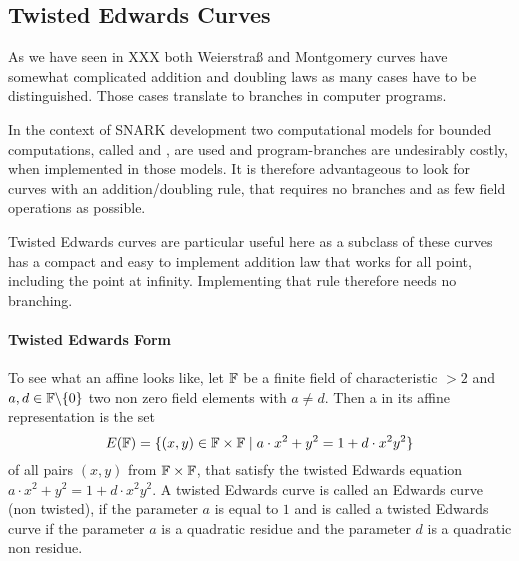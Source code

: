 
\subsection{Twisted Edwards Curves}
As we have seen in XXX both Weierstraß and Montgomery curves have somewhat complicated addition and doubling laws as many cases have to be distinguished. Those cases translate to branches in computer programs.

In the context of SNARK development two computational models for bounded computations, called  and , are used and program-branches are undesirably costly, when implemented in those models. It is therefore advantageous to look for curves with an addition/doubling rule, that requires no branches and as few field operations as possible.

Twisted Edwards curves are particular useful here as a subclass of these curves has a compact and easy to implement addition law that works for all point, including the point at infinity. Implementing that rule therefore needs no branching. 
\paragraph{Twisted Edwards Form}
To see what an affine  looks like, let $\mathbb{F}$ be a finite field of characteristic $>2$ and $a,d\in \mathbb{F}\backslash\{0\}$ two non zero field elements with $a\neq d$. Then a  in its affine representation is the set
\begin{equation}
E(\mathbb{F})=\{(x,y)\in\mathbb{F}\times\mathbb{F}\;|\; a\cdot x^2+y^2= 1+d\cdot x^2y^2\}
\end{equation} 
of all pairs $(x,y)$ from $\mathbb{F}\times \mathbb{F}$, that satisfy the twisted Edwards equation $a\cdot x^2+y^2= 1+d\cdot x^2y^2$. A twisted Edwards curve is called an Edwards curve (non twisted), if the parameter $a$ is equal to $1$ and is called a  twisted Edwards curve if the parameter $a$ is a quadratic residue and the parameter $d$ is a quadratic non residue.

